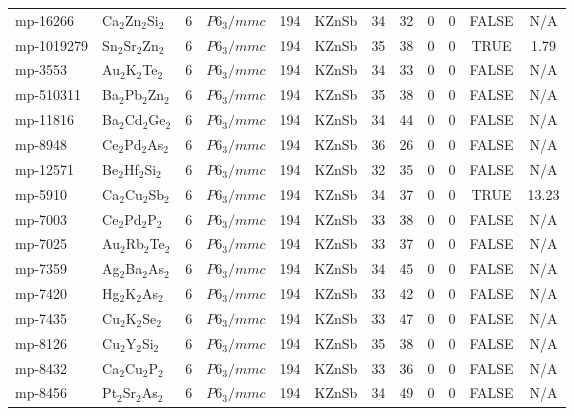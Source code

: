 {\begin{longtable}{llcccccccccc}
    mp-16266 & Ca$_{2}$Zn$_{2}$Si$_{2}$ & 6     & $P6_3/mmc$ & 194   & KZnSb & 34    & 32    & 0     & 0     & FALSE & N/A \\
    mp-1019279 & Sn$_{2}$Sr$_{2}$Zn$_{2}$ & 6     & $P6_3/mmc$ & 194   & KZnSb & 35    & 38    & 0     & 0     & TRUE  & 1.79  \\
    mp-3553 & Au$_{2}$K$_{2}$Te$_{2}$ & 6     & $P6_3/mmc$ & 194   & KZnSb & 34    & 33    & 0     & 0     & FALSE & N/A \\
    mp-510311 & Ba$_{2}$Pb$_{2}$Zn$_{2}$ & 6     & $P6_3/mmc$ & 194   & KZnSb & 35    & 38    & 0     & 0     & FALSE & N/A \\
    mp-11816 & Ba$_{2}$Cd$_{2}$Ge$_{2}$ & 6     & $P6_3/mmc$ & 194   & KZnSb & 34    & 44    & 0     & 0     & FALSE & N/A \\
    mp-8948 & Ce$_{2}$Pd$_{2}$As$_{2}$ & 6     & $P6_3/mmc$ & 194   & KZnSb & 36    & 26    & 0     & 0     & FALSE & N/A \\
    mp-12571 & Be$_{2}$Hf$_{2}$Si$_{2}$ & 6     & $P6_3/mmc$ & 194   & KZnSb & 32    & 35    & 0     & 0     & FALSE & N/A \\
    mp-5910 & Ca$_{2}$Cu$_{2}$Sb$_{2}$ & 6     & $P6_3/mmc$ & 194   & KZnSb & 34    & 37    & 0     & 0     & TRUE  & 13.23  \\
    mp-7003 & Ce$_{2}$Pd$_{2}$P$_{2}$ & 6     & $P6_3/mmc$ & 194   & KZnSb & 33    & 38    & 0     & 0     & FALSE & N/A \\
    mp-7025 & Au$_{2}$Rb$_{2}$Te$_{2}$ & 6     & $P6_3/mmc$ & 194   & KZnSb & 33    & 37    & 0     & 0     & FALSE & N/A \\
    mp-7359 & Ag$_{2}$Ba$_{2}$As$_{2}$ & 6     & $P6_3/mmc$ & 194   & KZnSb & 34    & 45    & 0     & 0     & FALSE & N/A \\
    mp-7420 & Hg$_{2}$K$_{2}$As$_{2}$ & 6     & $P6_3/mmc$ & 194   & KZnSb & 33    & 42    & 0     & 0     & FALSE & N/A \\
    mp-7435 & Cu$_{2}$K$_{2}$Se$_{2}$ & 6     & $P6_3/mmc$ & 194   & KZnSb & 33    & 47    & 0     & 0     & FALSE & N/A \\
    mp-8126 & Cu$_{2}$Y$_{2}$Si$_{2}$ & 6     & $P6_3/mmc$ & 194   & KZnSb & 35    & 38    & 0     & 0     & FALSE & N/A \\
    mp-8432 & Ca$_{2}$Cu$_{2}$P$_{2}$ & 6     & $P6_3/mmc$ & 194   & KZnSb & 33    & 36    & 0     & 0     & FALSE & N/A \\
    mp-8456 & Pt$_{2}$Sr$_{2}$As$_{2}$ & 6     & $P6_3/mmc$ & 194   & KZnSb & 34    & 49    & 0     & 0     & FALSE & N/A \\

\end{longtable}}
